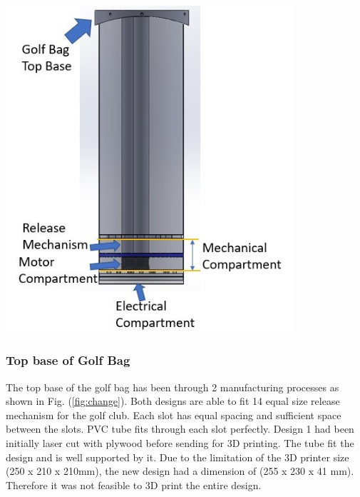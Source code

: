 \documentclass[11pt,landscape]{article}
\newenvironment{Figure}
  {\par\medskip\noindent\minipage{\linewidth}}
  {\endminipage\par\medskip}
\begin{document}
\begin{multicols}{3}
    
    \begin{Figure}
        \begin{center}
            \includegraphics[width=0.8\textwidth]{Figure16.jpg}
            \label{fig:golfbag}
        \end{center}
    \end{Figure}
    
    
    
    \subsubsection{Top base of Golf Bag}
    The top base of the golf bag has been through 2 manufacturing processes
    as shown in Fig. (\ref{fig:change}). Both designs are able to fit 14 equal
    size release mechanism for the golf club. Each slot has equal spacing and
    sufficient space between the slots. PVC tube fits through each slot
    perfectly. Design 1 had been initially laser cut with plywood before sending
    for 3D printing. The tube fit the design and is well supported by it.
    Due to the limitation of the 3D printer size (250 x 210 x 210mm), the new
    design had a dimension of (255 x 230 x 41 mm). Therefore it was not feasible
    to 3D print the entire design.
    

\end{multicols}
\end{document}
